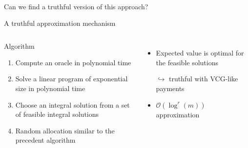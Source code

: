 \documentclass[aspectratio=169]{beamer}
\begin{document}
\begin{frame}[standout]
    Can we find a \alert{truthful version} of this approach?
\end{frame}

\begin{frame}{A truthful approximation mechanism}
    \begin{columns}



        \begin{block}{Algorithm}
            \begin{enumerate}
                \item Compute an oracle in polynomial time
                \item Solve a linear program of exponential size in polynomial time
                \item Choose an integral solution from a set of feasible integral solutions
                \item Random allocation similar to the precedent algorithm
            \end{enumerate}
        \end{block}



        \begin{itemize}
            \item Expected value is optimal for the feasible solutions

            \(\hookrightarrow\) truthful with VCG-like payments
            \item \(\mathcal{O}(\log^r(m))\) approximation
        \end{itemize}

    \end{columns}
\end{frame}
\end{document}

